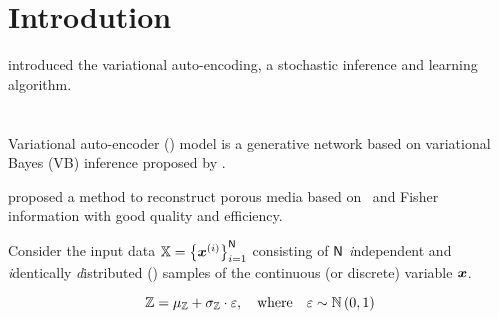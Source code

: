 \section{Introdution}

\cite{kingma2022autoencoding} introduced the variational auto-encoding, a stochastic inference and learning algorithm.


\cite{Higgins2016betaVAELB}
\section{\cite{Zhang2022}}

Variational auto-encoder (\VAE) model is a generative network based on variational Bayes (VB) inference proposed by \cite{kingma2014}.

\cite{Zhang2022} proposed a method to reconstruct porous media based on \VAE\ and Fisher information with good quality and efficiency.

Consider the input data $\mathbb{X} = \left\{ \boldsymbol{x}^{(i)} \right\}_{i=1}^{\mathsf{N}}$ consisting of $\mathsf{N}$
\textit{i}ndependent and \textit{i}dentically \textit{d}istributed (\iid) samples of the continuous (or discrete) variable $\boldsymbol{x}$.

\begin{figure}[H]
 \centering
 
\end{figure}

\begin{equation}
 \mathbb{Z} = {\mu_{\mathbb{Z}}} + {\sigma_{\mathbb{Z}}} \cdot \varepsilon, \quad \mbox{where} \quad \varepsilon \sim \mathbb{N}\left(0,1\right)
\end{equation}

